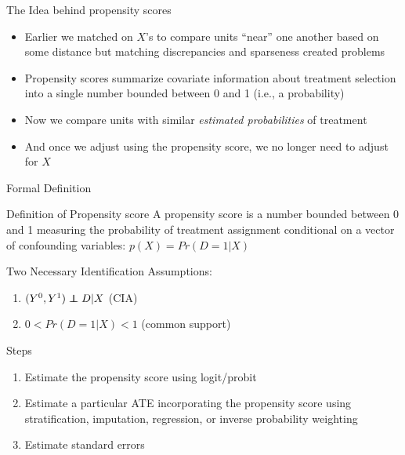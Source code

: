 \documentclass{beamer}
\newcommand\independent{\protect\mathpalette{\protect\independenT}{\perp}}
\def\independenT#1#2{\mathrel{\rlap{$#1#2$}\mkern2mu{#1#2}}}
\begin{document}
\begin{frame}{The Idea behind propensity scores}
	
	\begin{itemize}
	\item Earlier we matched on $X$'s to compare units ``near'' one another based on some distance but matching discrepancies and sparseness created problems
	\item Propensity scores summarize covariate information about treatment selection into a single number bounded between 0 and 1 (i.e., a probability)
	\item Now we compare units with similar \emph{estimated probabilities} of treatment
	\item And once we adjust using the propensity score, we no longer need to adjust for $X$
	\end{itemize}
\end{frame}



\begin{frame}{Formal Definition}
	
	\begin{block}{Definition of Propensity score}
	A propensity score is a number bounded between 0 and 1 measuring the probability of treatment assignment conditional on a vector of confounding variables: $p(X)=Pr(D=1 | X)$
	\end{block}
	
	Two Necessary Identification Assumptions:
	\begin{enumerate}
	\item $(Y^0,Y^1) \independent{D}|X$ (CIA)
	\item $0<Pr(D=1|X)<1$ (common support)
	\end{enumerate}

\end{frame}


\begin{frame}{Steps}
	
		\begin{enumerate}
		\item Estimate the propensity score using logit/probit
		\item Estimate a particular ATE incorporating the propensity score using stratification, imputation, regression, or inverse probability weighting
		\item Estimate standard errors
		\end{enumerate}
\end{frame}
\end{document}
